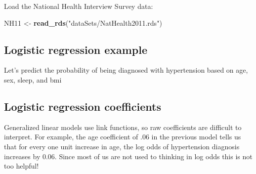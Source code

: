 \documentclass[]{book}
\newenvironment{Shaded}{\begin{snugshade}}{\end{snugshade}}
\newcommand{\KeywordTok}[1]{\textcolor[rgb]{0.13,0.29,0.53}{\textbf{#1}}}
\newcommand{\DataTypeTok}[1]{\textcolor[rgb]{0.13,0.29,0.53}{#1}}
\newcommand{\StringTok}[1]{\textcolor[rgb]{0.31,0.60,0.02}{#1}}
\newcommand{\CommentTok}[1]{\textcolor[rgb]{0.56,0.35,0.01}{\textit{#1}}}
\newcommand{\OperatorTok}[1]{\textcolor[rgb]{0.81,0.36,0.00}{\textbf{#1}}}
\newcommand{\NormalTok}[1]{#1}
\begin{document}
Load the National Health Interview Survey data:

\begin{Shaded}
\begin{Highlighting}[]
\NormalTok{  NH11 <-}\StringTok{ }\KeywordTok{read_rds}\NormalTok{(}\StringTok{"dataSets/NatHealth2011.rds"}\NormalTok{)}
\end{Highlighting}
\end{Shaded}

\subsection{Logistic regression
example}\label{logistic-regression-example}

Let's predict the probability of being diagnosed with hypertension based
on age, sex, sleep, and bmi

\begin{Shaded}
\end{Shaded}

\subsection{Logistic regression
coefficients}\label{logistic-regression-coefficients}

Generalized linear models use link functions, so raw coefficients are
difficult to interpret. For example, the age coefficient of .06 in the
previous model tells us that for every one unit increase in age, the log
odds of hypertension diagnosis increases by 0.06. Since most of us are
not used to thinking in log odds this is not too helpful!
\end{document}
